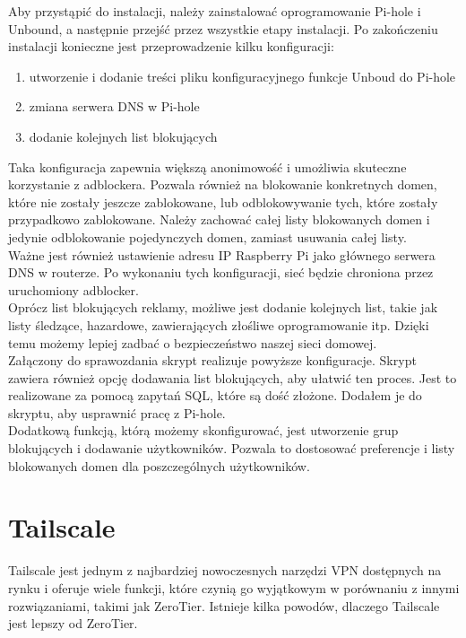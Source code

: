 \documentclass{article}
\begin{document}
Aby przystąpić do instalacji, należy zainstalować oprogramowanie Pi-hole i Unbound, a następnie przejść przez wszystkie etapy instalacji. Po zakończeniu instalacji konieczne jest przeprowadzenie kilku konfiguracji:
\begin{enumerate}[label=\textbullet]
  \item utworzenie i dodanie treści pliku konfiguracyjnego funkcje Unboud do Pi-hole
  \item zmiana serwera DNS w Pi-hole
  \item dodanie kolejnych list blokujących
\end{enumerate}
Taka konfiguracja zapewnia większą anonimowość i umożliwia skuteczne korzystanie z adblockera. Pozwala również na blokowanie konkretnych domen, które nie zostały jeszcze zablokowane, lub odblokowywanie tych, które zostały przypadkowo zablokowane. Należy zachować całej listy blokowanych domen i jedynie odblokowanie pojedynczych domen, zamiast usuwania całej listy.\\

Ważne jest również ustawienie adresu IP Raspberry Pi jako głównego serwera DNS w routerze. Po wykonaniu tych konfiguracji, sieć będzie chroniona przez uruchomiony adblocker.\\

Oprócz list blokujących reklamy, możliwe jest dodanie kolejnych list, takie jak listy śledzące, hazardowe, zawierających złośliwe oprogramowanie itp. Dzięki temu możemy lepiej zadbać o bezpieczeństwo naszej sieci domowej.\\

Załączony do sprawozdania skrypt realizuje powyższe konfiguracje. Skrypt zawiera również opcję dodawania list blokujących, aby ułatwić ten proces. Jest to realizowane za pomocą zapytań SQL, które są dość złożone. Dodałem je do skryptu, aby usprawnić pracę z Pi-hole.\\

Dodatkową funkcją, którą możemy skonfigurować, jest utworzenie grup blokujących i dodawanie użytkowników. Pozwala to dostosować preferencje i listy blokowanych domen dla poszczególnych użytkowników.\cite{pihole}


\section{Tailscale}
Tailscale jest jednym z najbardziej nowoczesnych narzędzi VPN dostępnych na rynku i oferuje wiele funkcji, które czynią go wyjątkowym w porównaniu z innymi rozwiązaniami, takimi jak ZeroTier. Istnieje kilka powodów, dlaczego Tailscale jest lepszy od ZeroTier.\\
\end{document}
